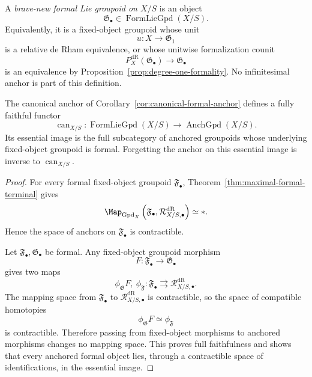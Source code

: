 \begin{definition}
\label{def:formal-lie-groupoid}
A \emph{brave-new formal Lie groupoid on $X/S$} is an object
\[
    \mathfrak G_\bullet\in\operatorname{FormLieGpd}(X/S).
\]
Equivalently, it is a fixed-object groupoid whose unit
\[
    u:X\longrightarrow\mathfrak G_1
\]
is a relative de Rham equivalence, or whose unitwise formalization counit
\[
    P_X^{\mathrm{dR}}(\mathfrak G_\bullet)
    \longrightarrow
    \mathfrak G_\bullet
\]
is an equivalence by Proposition~\ref{prop:degree-one-formality}.  No
infinitesimal anchor is part of this definition.
\end{definition}

\begin{theorem}
\label{thm:formal-anchor-forgetful-equivalence}
The canonical anchor of
Corollary~\ref{cor:canonical-formal-anchor} defines a fully faithful functor
\[
    \operatorname{can}_{X/S}:
    \operatorname{FormLieGpd}(X/S)
    \longrightarrow
    \operatorname{AnchGpd}(X/S).
\]
Its essential image is the full subcategory of anchored groupoids whose
underlying fixed-object groupoid is formal.  Forgetting the anchor on this
essential image is inverse to $\operatorname{can}_{X/S}$.
\end{theorem}

\begin{proof}
For every formal fixed-object groupoid $\mathfrak F_\bullet$,
Theorem~\ref{thm:maximal-formal-terminal} gives
\[
    \Map_{\operatorname{Gpd}_X}
    \left(
        \mathfrak F_\bullet,
        \mathcal R^{\mathrm{dR}}_{X/S,\bullet}
    \right)
    \simeq *.
\]
Hence the space of anchors on $\mathfrak F_\bullet$ is contractible.

Let $\mathfrak F_\bullet,\mathfrak G_\bullet$ be formal.  Any fixed-object
groupoid morphism
\[
    F:\mathfrak F_\bullet\longrightarrow\mathfrak G_\bullet
\]
gives two maps
\[
    \phi_{\mathfrak G}F,\ \phi_{\mathfrak F}:
    \mathfrak F_\bullet\rightrightarrows \mathcal R^{\mathrm{dR}}_{X/S,\bullet}.
\]
The mapping space from $\mathfrak F_\bullet$ to $\mathcal R^{\mathrm{dR}}_{X/S,\bullet}$ is
contractible, so the space of compatible homotopies
\[
    \phi_{\mathfrak G}F\simeq\phi_{\mathfrak F}
\]
is contractible.  Therefore passing from fixed-object morphisms to anchored
morphisms changes no mapping space.  This proves full faithfulness and shows
that every anchored formal object lies, through a contractible space of
identifications, in the essential image.
\end{proof}

